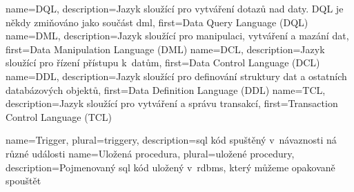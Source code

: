 
{
    name={DQL},
    description={Jazyk sloužící pro vytváření dotazů nad daty. DQL je někdy zmiňováno jako součást \gls{dml}},
    first={Data Query Language (DQL)}
}
{
    name={DML},
    description={Jazyk sloužící pro manipulaci, vytváření a mazání dat},
    first={Data Manipulation Language (DML)}
}
{
    name={DCL},
    description={Jazyk sloužící pro řízení přístupu k~datům},
    first={Data Control Language (DCL)}
}
{
    name={DDL},
    description={Jazyk sloužící pro definování struktury dat a ostatních databázových objektů},
    first={Data Definition Language (DDL)}
}
{
    name={TCL},
    description={Jazyk sloužící pro vytváření a správu transakcí},
    first={Transaction Control Language (TCL)}
}


{
    name={Trigger},
    plural={triggery},
    description={\acrshort{sql} kód spuštěný v~návaznosti ná různé události}
}
{
    name={Uložená procedura},
    plural={uložené procedury},
    description={Pojmenovaný \acrshort{sql} kód uložený v~\acrshort{rdbms}, který můžeme opakovaně spouštět}
}